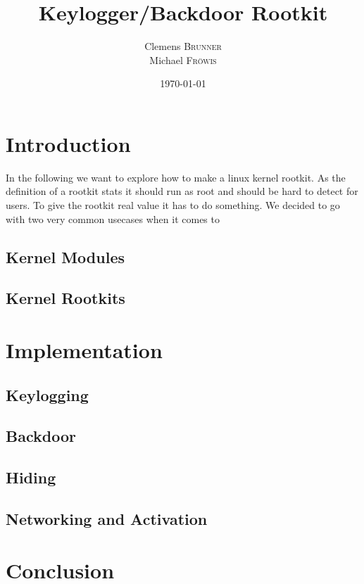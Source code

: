 \documentclass[a4paper,12pt,oneside]{article}
\title{Keylogger/Backdoor Rootkit} %
\author{Clemens \textsc{Brunner}\\
        Michael \textsc{Fröwis}} %
\date{\today} %
\begin{document}
\maketitle %
\thispagestyle{empty}
\newpage
\tableofcontents
\thispagestyle{empty}

\newpage

\section{Introduction}

In the following we want to explore how to make a linux kernel rootkit. As the definition of a rootkit stats it should run as root and should be hard to detect for users. To give the rootkit real value it has to do something. We decided to go with two very common usecases when it comes to 


\subsection{Kernel Modules}

\subsection{Kernel Rootkits}

\section{Implementation}
\subsection{Keylogging}
\subsection{Backdoor}
\subsection{Hiding}
\subsection{Networking and Activation}

\section{Conclusion}
\end{document}
